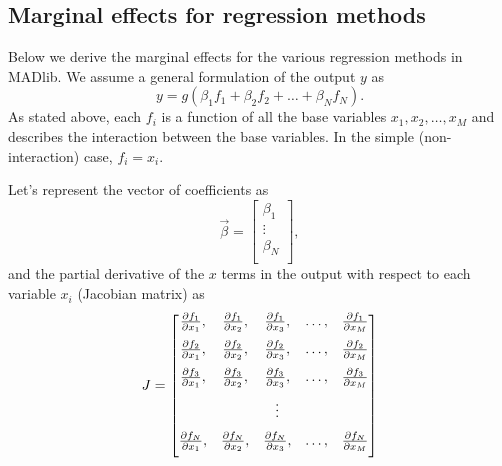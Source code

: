 \subsection{Marginal effects for regression methods} %
\label{sub:marginal_effects_for_regression_methods}

Below we derive the marginal effects for the various regression methods in MADlib.
We assume a general formulation of the output $y$ as
$$
    y = g(\beta_1 f_1 + \beta_2 f_2 + \ldots  + \beta_{N} f_{N}).
$$
As stated above, each $f_i$ is a function of all the base variables $x_1, x_2, \ldots, x_M$ and
describes the interaction between the base variables. In the simple
(non-interaction) case, $f_i = x_i$.

Let's represent the vector of coefficients as
$$
    \vec{\beta} =
        \begin{bmatrix}
            \beta_1 \\
            \vdots \\
            \beta_N \\
        \end{bmatrix},
$$
and the partial derivative of the $x$ terms in the output
with respect to each variable $x_i$ (Jacobian matrix) as
$$J =
    \begin{bmatrix}
        \pder[f_1]{x_1}, & \pder[f_1]{x_2}, & \pder[f_1]{x_3}, & \ldots, & \pder[f_1]{x_M}\\[7pt]
        \pder[f_2]{x_1}, & \pder[f_2]{x_2}, & \pder[f_2]{x_3}, & \ldots, & \pder[f_2]{x_M}\\[7pt]
        \pder[f_3]{x_1}, & \pder[f_3]{x_2}, & \pder[f_3]{x_3}, & \ldots, & \pder[f_3]{x_M}\\[7pt]
                           &                    & \vdots    &        & \\[7pt]
        \pder[f_N]{x_1}, & \pder[f_N]{x_2}, & \pder[f_N]{x_3}, & \ldots, & \pder[f_N]{x_M}\\[7pt]
    \end{bmatrix}
$$

